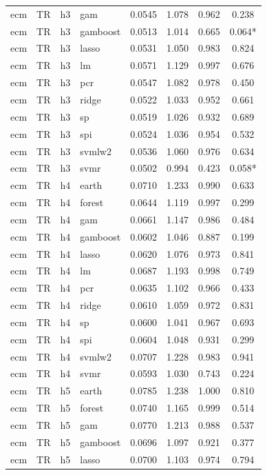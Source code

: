 \begin{ThreePartTable}
\begin{longtable}[t]{llclcccc}
ecm & TR & h3 & gam & 0.0545 & 1.078 & 0.962 & 0.238\\
ecm & TR & h3 & gamboost & 0.0513 & 1.014 & 0.665 & 0.064*\\
ecm & TR & h3 & lasso & 0.0531 & 1.050 & 0.983 & 0.824\\
ecm & TR & h3 & lm & 0.0571 & 1.129 & 0.997 & 0.676\\
ecm & TR & h3 & pcr & 0.0547 & 1.082 & 0.978 & 0.450\\
ecm & TR & h3 & ridge & 0.0522 & 1.033 & 0.952 & 0.661\\
ecm & TR & h3 & sp & 0.0519 & 1.026 & 0.932 & 0.689\\
ecm & TR & h3 & spi & 0.0524 & 1.036 & 0.954 & 0.532\\
ecm & TR & h3 & svmlw2 & 0.0536 & 1.060 & 0.976 & 0.634\\
ecm & TR & h3 & svmr & 0.0502 & 0.994 & 0.423 & 0.058*\\
\addlinespace
ecm & TR & h4 & earth & 0.0710 & 1.233 & 0.990 & 0.633\\
ecm & TR & h4 & forest & 0.0644 & 1.119 & 0.997 & 0.299\\
ecm & TR & h4 & gam & 0.0661 & 1.147 & 0.986 & 0.484\\
ecm & TR & h4 & gamboost & 0.0602 & 1.046 & 0.887 & 0.199\\
ecm & TR & h4 & lasso & 0.0620 & 1.076 & 0.973 & 0.841\\
ecm & TR & h4 & lm & 0.0687 & 1.193 & 0.998 & 0.749\\
ecm & TR & h4 & pcr & 0.0635 & 1.102 & 0.966 & 0.433\\
ecm & TR & h4 & ridge & 0.0610 & 1.059 & 0.972 & 0.831\\
ecm & TR & h4 & sp & 0.0600 & 1.041 & 0.967 & 0.693\\
ecm & TR & h4 & spi & 0.0604 & 1.048 & 0.931 & 0.299\\
ecm & TR & h4 & svmlw2 & 0.0707 & 1.228 & 0.983 & 0.941\\
ecm & TR & h4 & svmr & 0.0593 & 1.030 & 0.743 & 0.224\\
\addlinespace
ecm & TR & h5 & earth & 0.0785 & 1.238 & 1.000 & 0.810\\
ecm & TR & h5 & forest & 0.0740 & 1.165 & 0.999 & 0.514\\
ecm & TR & h5 & gam & 0.0770 & 1.213 & 0.988 & 0.537\\
ecm & TR & h5 & gamboost & 0.0696 & 1.097 & 0.921 & 0.377\\
ecm & TR & h5 & lasso & 0.0700 & 1.103 & 0.974 & 0.794\\

\end{longtable}
\end{ThreePartTable}
